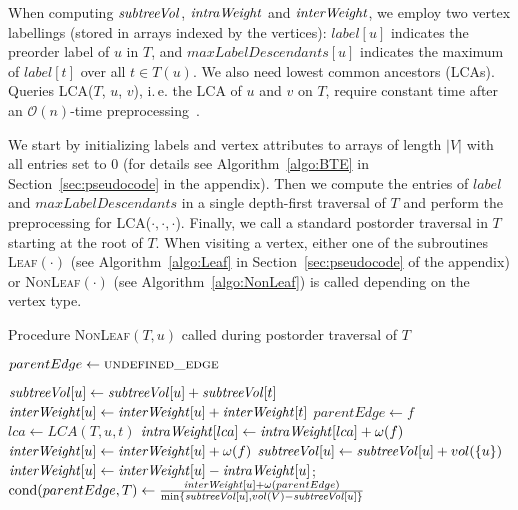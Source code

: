 \documentclass[pdftex]{llncs}
\newcommand{\ie}{i.\,e.\xspace}
\newcommand{\cond}{\operatorname{cond}}
\newcommand{\bigO}{\mathcal{O}}
\DeclareMathOperator{\intraWeight}{\it intraWeight}
\DeclareMathOperator{\interWeight}{\it interWeight}
\DeclareMathOperator{\subtreeVol}{\it subtreeVol}
\numberwithin{equation}{section}
\numberwithin{example}{section}
\numberwithin{table}{section}
\begin{document}
When computing $\subtreeVol$, $\intraWeight$ and $\interWeight$, we
employ two vertex labellings (stored in arrays indexed by the
vertices): $label[u]$ indicates the preorder label of $u$ in $T$, and
$maxLabelDescendants[u]$ indicates the maximum of $label[t]$ over all
$t \in T(u)$. We also need lowest common ancestors (LCAs). Queries
\textsc{LCA}($T$, $u$, $v$), \ie the LCA of $u$ and $v$ on $T$,
require constant time after an $\bigO(n)$-time
preprocessing~\cite{Bender:2000:LPR:646388.690192}.


We start by initializing labels and vertex attributes to arrays of
length $\vert V \vert$ with all entries set to $0$ (for details see
Algorithm~\ref{algo:BTE} in Section~\ref{sec:pseudocode} in the
appendix). Then we compute the entries of $label$ and
$maxLabelDescendants$ in a single depth-first traversal of $T$ and
perform the preprocessing for \textsc{LCA}($\cdot, \cdot,
\cdot$). Finally, we call a standard postorder traversal in $T$
starting at the root of $T$. When visiting a vertex, either one of the
subroutines \textsc{Leaf}$(\cdot)$ (see Algorithm~\ref{algo:Leaf} in
Section~\ref{sec:pseudocode} of the appendix) or
\textsc{NonLeaf}$(\cdot)$ (see Algorithm~\ref{algo:NonLeaf}) is called
depending on the vertex type.


\begin{algorithm}[tbp]
\caption{Procedure \textsc{NonLeaf}$(T, u)$ called during postorder traversal of $T$}
\label{algo:NonLeaf}
\begin{algorithmic}[1]
\State $parentEdge \gets \textsc{undefined\_edge}$

      \State $\subtreeVol[u] \gets \subtreeVol[u] + \subtreeVol[t]$
      \State $\interWeight[u] \gets \interWeight[u] + \interWeight[t]$
    \Else
      \State $parentEdge \gets f$
    \EndIf
  \Else
  \\ 
    \State $lca \gets LCA(T, u, t)$
    \State $\intraWeight[lca] \gets \intraWeight[lca] + \omega(f)$
    \State $\interWeight[u] \gets \interWeight[u] + \omega(f)$
  \EndIf
\EndIf
\EndFor
\State $\subtreeVol[u] \gets \subtreeVol[u] + vol(\{u\})$ \State
$\interWeight[u] \gets \interWeight[u] - \intraWeight[u]$;
 \State
$\cond(parentEdge, T) \gets \frac{\interWeight[u] +
  \omega(parentEdge)}{\min\{\subtreeVol[u], vol(V) - \subtreeVol[u]\}} $
\EndIf
\end{algorithmic}
\end{algorithm}
\end{document}
